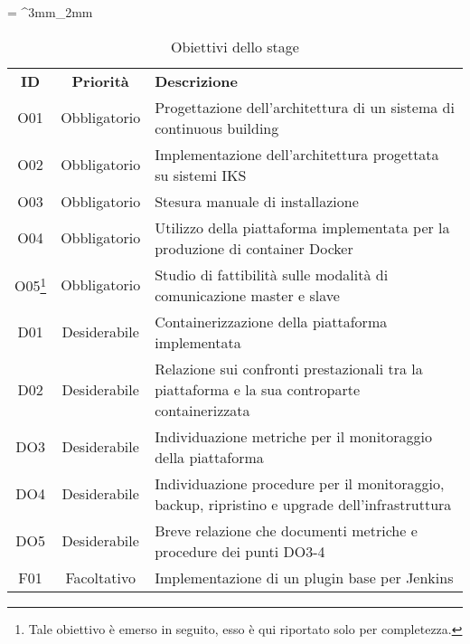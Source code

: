 \tabulinesep = ^3mm_2mm
\begin{longtabu} to \textwidth {ccX}
    \caption[Obiettivi dello stage]{Obiettivi dello stage}
    \label{tab:obiettivi-iniziali}
    \endlastfoot
    \rowfont{\bfseries\sffamily\leavevmode\color{white}}
    \textbf{ID} & \textbf{Priorità} & \textbf{Descrizione} \\
    O01 & Obbligatorio & Progettazione dell’architettura di un sistema di \gls{continuous building} \\ %
    O02 & Obbligatorio & Implementazione dell’architettura progettata su sistemi IKS \\ %
    O03 & Obbligatorio & Stesura manuale di installazione \\ %
    O04 & Obbligatorio & Utilizzo della piattaforma implementata per la produzione di \gls{container} Docker \\ %
    O05\footnote{Tale obiettivo è emerso in seguito, esso è qui riportato solo per completezza.} & Obbligatorio & Studio di fattibilità sulle modalità di comunicazione \gls{master} e \gls{slave} \\ %
    D01 & Desiderabile & Containerizzazione della piattaforma implementata \\ %
    D02 & Desiderabile & Relazione sui confronti prestazionali tra la piattaforma e la sua controparte containerizzata \\ %
    DO3 & Desiderabile & Individuazione metriche per il monitoraggio della piattaforma \\ %
    DO4 & Desiderabile &  Individuazione procedure per il monitoraggio, backup, ripristino e upgrade dell’infrastruttura \\ %
    DO5 & Desiderabile & Breve relazione che documenti metriche e procedure dei punti DO3-4 \\ %
    F01 & Facoltativo & Implementazione di un plugin base per Jenkins \\ %
\end{longtabu}